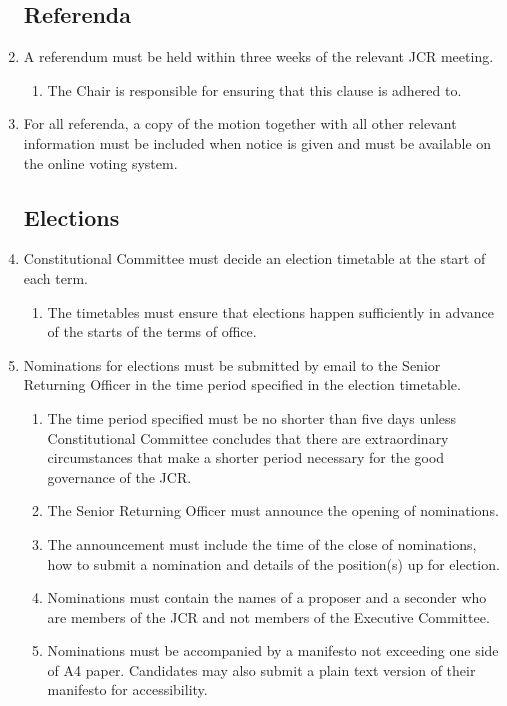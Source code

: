 \documentclass[12pt]{article}
\begin{document}
\begin{enumerate}
    \subsection{Referenda}
    \item A referendum must be held within three weeks of the relevant JCR meeting.
    \begin{enumerate}
        \item The Chair is responsible for ensuring that this clause is adhered to.
    \end{enumerate}
    \item For all referenda, a copy of the motion together with all other relevant information must be included when notice is given and must be available on the online voting system.
    \subsection{Elections}
    \item Constitutional Committee must decide an election timetable at the start of each term.
    \begin{enumerate}
        \item The timetables must ensure that elections happen sufficiently in advance of the starts of the terms of office.
    \end{enumerate}
    \item Nominations for elections must be submitted by email to the Senior Returning Officer in the time period specified in the election timetable.
    \begin{enumerate}
        \item The time period specified must be no shorter than five days unless Constitutional Committee concludes that there are extraordinary circumstances that make a shorter period necessary for the good governance of the JCR.
        \item The Senior Returning Officer must announce the opening of nominations.
        \item The announcement must include the time of the close of nominations, how to submit a nomination and details of the position(s) up for election.
        \item Nominations must contain the names of a proposer and a seconder who are members of the JCR and not members of the Executive Committee.
        \item Nominations must be accompanied by a manifesto not exceeding one side of A4 paper. Candidates may also submit a plain text version of their manifesto for accessibility.

\end{enumerate}
\end{enumerate}
\end{document}
